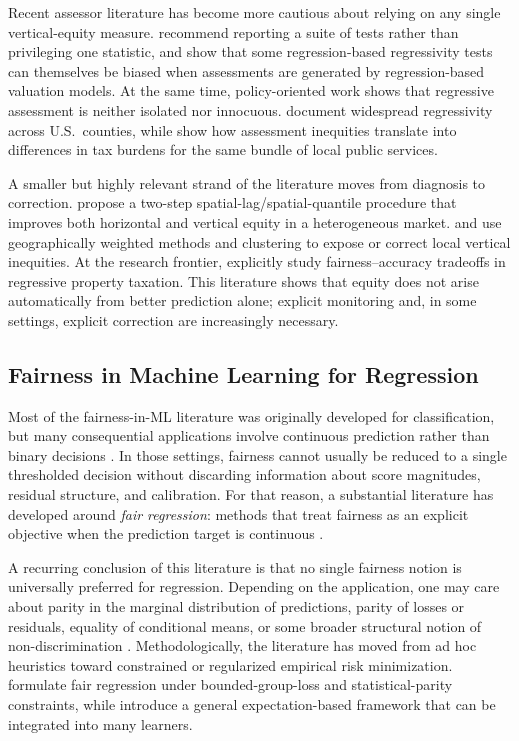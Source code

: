 \documentclass[12pt]{article}
\theoremstyle{plain}
\theoremstyle{definition}
\begin{document}
Recent assessor literature has become more cautious about relying on any single vertical-equity measure. \textcite{IAAO2023VerticalReview} recommend reporting a suite of tests rather than privileging one statistic, and \textcite{McMillenSingh2023} show that some regression-based regressivity tests can themselves be biased when assessments are generated by regression-based valuation models. At the same time, policy-oriented work shows that regressive assessment is neither isolated nor innocuous. \textcite{Berry2021} document widespread regressivity across U.S.\ counties, while \textcite{AvenancioLeonHoward2022} show how assessment inequities translate into differences in tax burdens for the same bundle of local public services.

A smaller but highly relevant strand of the literature moves from diagnosis to correction. \textcite{Quintos2014} propose a two-step spatial-lag/spatial-quantile procedure that improves both horizontal and vertical equity in a heterogeneous market. \textcite{BidansetEtAl2019} and \textcite{BidansetEtAl2025} use geographically weighted methods and clustering to expose or correct local vertical inequities. At the research frontier, \textcite{CandoganHanLu2023} explicitly study fairness--accuracy tradeoffs in regressive property taxation. This literature shows that equity does not arise automatically from better prediction alone; explicit monitoring and, in some settings, explicit correction are increasingly necessary.

\subsection{Fairness in Machine Learning for Regression}

Most of the fairness-in-ML literature was originally developed for classification, but many consequential applications involve continuous prediction rather than binary decisions \cite{CatonHaas2024,BarocasHardtNarayanan2023}. In those settings, fairness cannot usually be reduced to a single thresholded decision without discarding information about score magnitudes, residual structure, and calibration. For that reason, a substantial literature has developed around \emph{fair regression}: methods that treat fairness as an explicit objective when the prediction target is continuous \cite{AgarwalDudikWu2019,FitzsimonsEtAl2019,ChzhenEtAl2020Wasserstein,ChzhenEtAl2020Recalibration,WeiEtAl2023}.

A recurring conclusion of this literature is that no single fairness notion is universally preferred for regression. Depending on the application, one may care about parity in the marginal distribution of predictions, parity of losses or residuals, equality of conditional means, or some broader structural notion of non-discrimination \cite{AgarwalDudikWu2019,CatonHaas2024,BarocasHardtNarayanan2023}. Methodologically, the literature has moved from ad hoc heuristics toward constrained or regularized empirical risk minimization. \textcite{AgarwalDudikWu2019} formulate fair regression under bounded-group-loss and statistical-parity constraints, while \textcite{FitzsimonsEtAl2019} introduce a general expectation-based framework that can be integrated into many learners.
\end{document}
